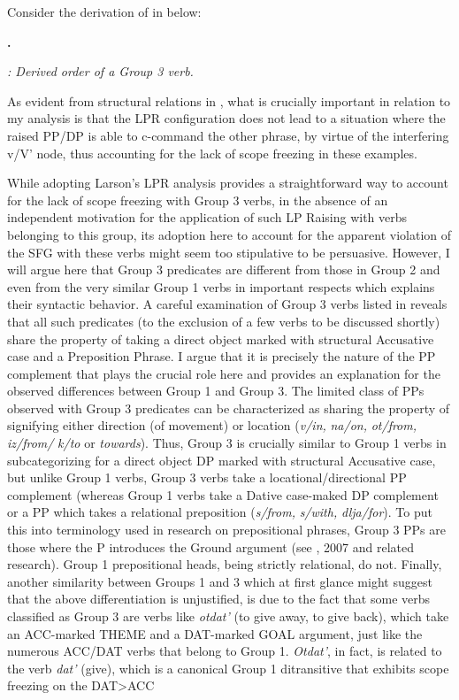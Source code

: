 \documentclass[output=paper,modfonts, nonflat]{langsci/langscibook}
\begin{document}
Consider the derivation of  in  below:

\textbf{.}

  
 

\textit{: Derived order of a Group 3 verb.}

As evident from structural relations in , what is crucially important in relation to my analysis is that the LPR configuration does not lead to a situation where the raised PP/DP is able to c-command the other phrase, by virtue of the interfering v/V' node, thus accounting for the lack of scope freezing in these examples.

  While adopting Larson's LPR analysis provides a straightforward way to account for the lack of scope freezing with Group 3 verbs, in the absence of an independent motivation for the application of such LP Raising with verbs belonging to this group, its adoption here to account for the apparent violation of the SFG with these verbs might seem too stipulative to be persuasive. However, I will argue here that Group 3 predicates are different from those in Group 2 and even from the very similar Group 1 verbs in important respects which explains their syntactic behavior. A careful examination of Group 3 verbs listed in  reveals that all such predicates (to the exclusion of a few verbs to be discussed shortly) share the property of taking a direct object marked with structural Accusative case and a Preposition Phrase. I argue that it is precisely the nature of the PP complement that plays the crucial role here and provides an explanation for the observed differences between Group 1 and Group 3. The limited class of PPs observed with Group 3 predicates can be characterized as sharing the property of signifying either direction (of movement) or location (\textit{v/in,} \textit{na/on,} \textit{ot/from,} \textit{iz/from/} \textit{k/to} or \textit{towards}). Thus, Group 3 is crucially similar to Group 1 verbs in subcategorizing for a direct object DP marked with structural Accusative case, but unlike Group 1 verbs, Group 3 verbs take a locational/directional PP complement (whereas Group 1 verbs take a Dative case-maked DP complement or a PP which takes a relational preposition (\textit{s/from,} \textit{s/with,} \textit{dlja/for}). To put this into terminology used in research on prepositional phrases, Group 3 PPs are those where the P introduces the Ground argument (see \citealt{Svenonius2003}, 2007 and related research). Group 1 prepositional heads, being strictly relational, do not. Finally, another similarity between Groups 1 and 3 which at first glance might suggest that the above differentiation is unjustified, is due to the fact that some verbs classified as Group 3 are verbs like \textit{otdat'} (to give away, to give back), which take an ACC-marked THEME and a DAT-marked GOAL argument, just like the numerous ACC/DAT verbs that belong to Group 1. \textit{Otdat'}, in fact, is related to the verb \textit{dat'} (give), which is a canonical Group 1 ditransitive that exhibits scope freezing on the DAT>ACC 
\end{document}
